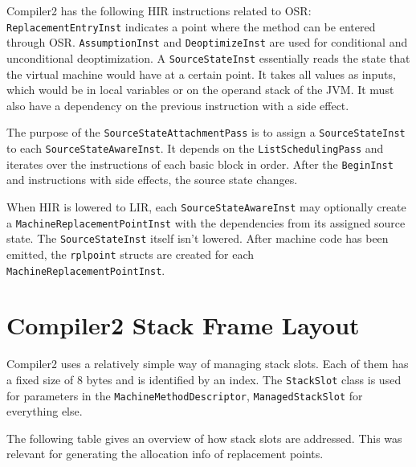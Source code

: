 \documentclass[draft,final]{vutinfth} %
\begin{document}
    Compiler2 has the following HIR instructions related to OSR:
    \lstinline{ReplacementEntryInst} indicates a point where the method can be entered through OSR.
    \lstinline{AssumptionInst} and \lstinline{DeoptimizeInst} are used for conditional and unconditional deoptimization.
    A \lstinline{SourceStateInst} essentially reads the state that the virtual machine would have at a certain point.
    It takes all values as inputs, which would be in local variables or on the operand stack of the JVM.
    It must also have a dependency on the previous instruction with a side effect.

    The purpose of the \lstinline{SourceStateAttachmentPass} is to assign a \lstinline{SourceStateInst} to each \lstinline{SourceStateAwareInst}.
    It depends on the \lstinline{ListSchedulingPass} and iterates over the instructions of each basic block in order.
    After the \lstinline{BeginInst} and instructions with side effects, the source state changes.

    When HIR is lowered to LIR, each \lstinline{SourceStateAwareInst}
    may optionally create a \lstinline{MachineReplacementPointInst} with the dependencies from its assigned source state.
    The \lstinline{SourceStateInst} itself isn't lowered.
    After machine code has been emitted, the \lstinline{rplpoint} structs are created
    for each \lstinline{MachineReplacementPointInst}.


    \section{Compiler2 Stack Frame Layout}\label{sec:compiler2-stackframe-layout}

    Compiler2 uses a relatively simple way of managing stack slots.
    Each of them has a fixed size of 8 bytes and is identified by an index.
    The \lstinline{StackSlot} class is used for parameters in the \lstinline{MachineMethodDescriptor},
    \lstinline{ManagedStackSlot} for everything else.

    The following table gives an overview of how stack slots are addressed.
    This was relevant for generating the allocation info of replacement points.
\end{document}
